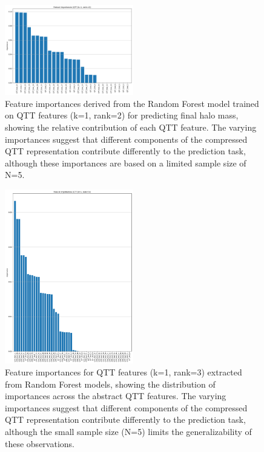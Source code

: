 \documentclass[twocolumn]{aastex631}
\begin{document}
\begin{figure}[h!]
    \centering
    \includegraphics[width=0.5\textwidth]{../input_files/plots/feature_importances_qtt_k1_r2_6_20250524-175150.png}
    \caption{Feature importances derived from the Random Forest model trained on QTT features (k=1, rank=2) for predicting final halo mass, showing the relative contribution of each QTT feature. The varying importances suggest that different components of the compressed QTT representation contribute differently to the prediction task, although these importances are based on a limited sample size of N=5.
}
    \label{fig:feature_importances_qtt}
\end{figure}

\begin{figure}[h!]
    \centering
    \includegraphics[width=0.5\textwidth]{../input_files/plots/feature_importances_qtt_k1_r3_9_20250524-175150.png}
    \caption{Feature importances for QTT features (k=1, rank=3) extracted from Random Forest models, showing the distribution of importances across the abstract QTT features. The varying importances suggest that different components of the compressed QTT representation contribute differently to the prediction task, although the small sample size (N=5) limits the generalizability of these observations.
}
    \label{fig:feature_importances_qtt_k1_r3}
\end{figure}
\end{document}

